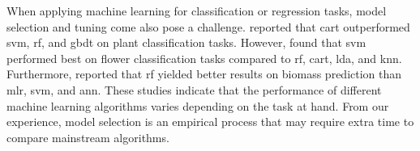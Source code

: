 When applying machine learning for classification or regression tasks, model selection and tuning come also pose a challenge. \citet{wang_landscape_2019} reported that \gls{cart} outperformed \gls{svm}, \gls{rf}, and \gls{gbdt} on plant classification tasks. However, \citet{han_drone_2021} found that \gls{svm} performed best on flower classification tasks compared to \gls{rf}, \gls{cart}, \gls{lda}, and \gls{knn}. Furthermore, \citet{han_modeling_2019} reported that \gls{rf} yielded better results on biomass prediction than \gls{mlr}, \gls{svm}, and \gls{ann}. These studies indicate that the performance of different machine learning algorithms varies depending on the task at hand. From our experience, model selection is an empirical process that may require extra time to compare mainstream algorithms.

